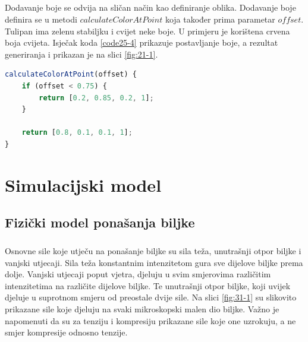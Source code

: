 \documentclass[times, utf8, diplomski]{fer}
\begin{document}
\paragraph{}
Dodavanje boje se odvija na sličan način kao definiranje oblika. Dodavanje boje definira se 
u metodi $calculateColorAtPoint$ koja također prima parametar $offset$. Tulipan ima zelenu 
stabiljku i cvijet neke boje. U primjeru je korištena crvena boja cvijeta. Isječak koda 
\ref{code25-4} prikazuje postavljanje boje, a rezultat generiranja i prikazan je na slici 
\ref{fig:21-1}.

\begin{lstlisting}[language=Javascript,caption=Dodavanje boja modelu,label=code25-4]
calculateColorAtPoint(offset) {
	if (offset < 0.75) {
		return [0.2, 0.85, 0.2, 1];
	}

	return [0.8, 0.1, 0.1, 1];
}
\end{lstlisting}


\chapter{Simulacijski model}
\section{Fizički model ponašanja biljke}
\paragraph{}
Osnovne sile koje utječu na ponašanje biljke su sila teža, unutrašnji otpor 
biljke i vanjski utjecaji. Sila teža konstantnim intenzitetom gura sve dijelove 
biljke prema dolje. Vanjski utjecaji poput vjetra, djeluju u svim smjerovima 
različitim intenzitetima na različite dijelove biljke. Te unutrašnji otpor 
biljke, koji uvijek djeluje u suprotnom smjeru od preostale dvije sile. Na 
slici \ref{fig:31-1} su slikovito prikazane sile koje djeluju na svaki mikroskopski malen 
dio biljke. Važno je napomenuti da su za tenziju i kompresiju prikazane sile koje one 
uzrokuju, a ne smjer kompresije odnosno tenzije.
\end{document}
